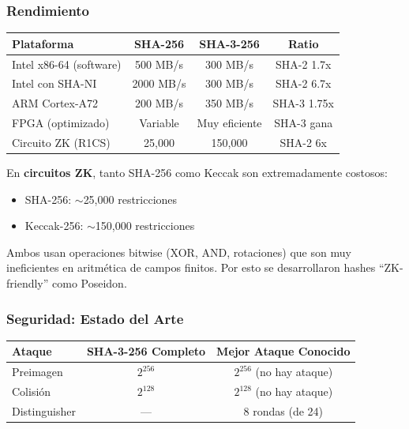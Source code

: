 \documentclass[11pt,a4paper,twoside,openright]{book}
\theoremstyle{definition}
\theoremstyle{plain}
\theoremstyle{remark}
\begin{document}
\subsubsection{Rendimiento}

\begin{center}
\begin{tabular}{lccc}
\toprule
\textbf{Plataforma} & \textbf{SHA-256} & \textbf{SHA-3-256} & \textbf{Ratio} \\
\midrule
Intel x86-64 (software) & 500 MB/s & 300 MB/s & SHA-2 1.7x \\
Intel con SHA-NI & 2000 MB/s & 300 MB/s & SHA-2 6.7x \\
ARM Cortex-A72 & 200 MB/s & 350 MB/s & SHA-3 1.75x \\
FPGA (optimizado) & Variable & Muy eficiente & SHA-3 gana \\
Circuito ZK (R1CS) & 25,000 & 150,000 & SHA-2 6x \\
\bottomrule
\end{tabular}
\end{center}

\begin{advertencia}
En \textbf{circuitos ZK}, tanto SHA-256 como Keccak son extremadamente costosos:
\begin{itemize}
    \item SHA-256: $\sim$25,000 restricciones
    \item Keccak-256: $\sim$150,000 restricciones
\end{itemize}

Ambos usan operaciones bitwise (XOR, AND, rotaciones) que son muy ineficientes en aritmética de campos finitos. Por esto se desarrollaron hashes ``ZK-friendly'' como Poseidon.
\end{advertencia}

\subsubsection{Seguridad: Estado del Arte}

\begin{center}
\begin{tabular}{lcc}
\toprule
\textbf{Ataque} & \textbf{SHA-3-256 Completo} & \textbf{Mejor Ataque Conocido} \\
\midrule
Preimagen & $2^{256}$ & $2^{256}$ (no hay ataque) \\
Colisión & $2^{128}$ & $2^{128}$ (no hay ataque) \\
Distinguisher & --- & 8 rondas (de 24) \\
\bottomrule
\end{tabular}
\end{center}
\end{document}
